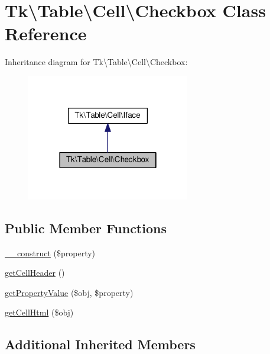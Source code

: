 \hypertarget{classTk_1_1Table_1_1Cell_1_1Checkbox}{\section{Tk\textbackslash{}Table\textbackslash{}Cell\textbackslash{}Checkbox Class Reference}
\label{classTk_1_1Table_1_1Cell_1_1Checkbox}
}


Inheritance diagram for Tk\textbackslash{}Table\textbackslash{}Cell\textbackslash{}Checkbox\+:\nopagebreak
\begin{figure}[H]
\begin{center}
\leavevmode
\includegraphics[width=202pt]{classTk_1_1Table_1_1Cell_1_1Checkbox__inherit__graph}
\end{center}
\end{figure}
\subsection*{Public Member Functions}
\begin{DoxyCompactItemize}
\item 
\hyperlink{classTk_1_1Table_1_1Cell_1_1Checkbox_a7e03fa1ce63c9f5fbfae53a76eb085e2}{\+\_\+\+\_\+construct} (\$property)
\item 
\hyperlink{classTk_1_1Table_1_1Cell_1_1Checkbox_afc79af4863df245e7ca21ed950a68a96}{get\+Cell\+Header} ()
\item 
\hyperlink{classTk_1_1Table_1_1Cell_1_1Checkbox_a691981f4df00120dbdd0b80bdde58b39}{get\+Property\+Value} (\$obj, \$property)
\item 
\hyperlink{classTk_1_1Table_1_1Cell_1_1Checkbox_aa8d31b07fe69fc9e042597132911738b}{get\+Cell\+Html} (\$obj)
\end{DoxyCompactItemize}
\subsection*{Additional Inherited Members}


